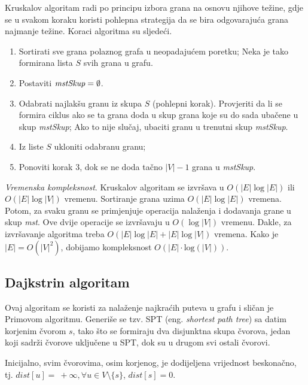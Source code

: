 \documentclass[a4paper, utf8, 11pt, colorlinks]{book}
\theoremstyle{definition}
\begin{document}
Kruskalov algoritam radi po principu izbora grana na osnovu njihove težine, gdje se u svakom koraku koristi pohlepna strategija da se bira odgovarajuća grana najmanje težine.
Koraci algoritma su sljedeći.


\begin{enumerate}
	
	\item Sortirati sve grana polaznog grafa u neopadajućem poretku; Neka je tako formirana lista $S$ svih grana u grafu.
	\item Postaviti $\emph{mstSkup} = \emptyset$. 
	\item Odabrati najlakšu granu iz skupa $S$ (pohlepni korak). Provjeriti da li se formira ciklus ako se ta 
	grana doda u skup grana koje su do sada ubačene u skup \emph{mstSkup}; Ako to nije slučaj, ubaciti granu u trenutni skup \emph{mstSkup}. 
	\item Iz liste $S$ ukloniti odabranu granu;
	\item Ponoviti korak 3, dok se ne doda tačno $|V|-1$ grana u \emph{mstSkup}.
\end{enumerate} 

 \emph{Vremenska kompleksnost}. Kruskalov algoritam se izvršava u $O(|E|\log |E|)$ ili $O(|E|\log |V|)$ vremenu. Sortiranje grana uzima $O(|E| \log|E|)$ vremena. Potom, za svaku granu 
se primjenjuje operacija nalaženja i dodavanja grane u skup \emph{mst}. Ove dvije operacije se izvršavaju u $O(\log |V|)$ vremenu. Dakle, za izvršavanje algoritma treba $O(|E|\log |E| + |E|\log |V|)$ vremena. Kako je $|E|=O(|V|^2)$, dobijamo kompleksnost $O(|E| \cdot \mathrm{log}(|V|))$. 

\subsection{Dajkstrin algoritam}

Ovaj algoritam se koristi za nalaženje najkraćih puteva u grafu i sličan je Primovom algoritmu. Generiše se tzv. SPT (eng. \emph{shortest path tree}) sa datim korjenim čvorom $s$, tako  što se formiraju dva disjunktna skupa čvorova, jedan koji sadrži čvorove uključene u SPT, dok su u drugom svi ostali čvorovi. 


Inicijalno, svim čvorovima, osim korjenog, je dodijeljena vrijednost beskonačno, tj. $dist[u]=\ +\infty, \forall u \in V\setminus \{s\}$, $dist[s]=0$. 
\end{document}
